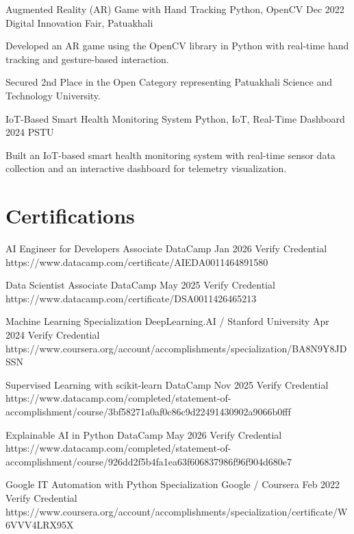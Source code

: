 \documentclass[11pt, a4paper]{article}
\begin{document}
\cvProject
    {Augmented Reality (AR) Game with Hand Tracking}
    {Python, OpenCV}
    {Dec 2022}
    {Digital Innovation Fair, Patuakhali}
    {
        \item Developed an AR game using the OpenCV library in Python with real-time hand tracking and gesture-based interaction.
        \item Secured 2nd Place in the Open Category representing Patuakhali Science and Technology University.
    }

\cvProject
    {IoT-Based Smart Health Monitoring System}
    {Python, IoT, Real-Time Dashboard}
    {2024}
    {PSTU}
    {
        \item Built an IoT-based smart health monitoring system with real-time sensor data collection and an interactive dashboard for telemetry visualization.
    }

\section{Certifications}
\cvCert
    {AI Engineer for Developers Associate}
    {DataCamp}
    {Jan 2026}
    {Verify Credential}
    {https://www.datacamp.com/certificate/AIEDA0011464891580}

\cvCert
    {Data Scientist Associate}
    {DataCamp}
    {May 2025}
    {Verify Credential}
    {https://www.datacamp.com/certificate/DSA0011426465213}

\cvCert
    {Machine Learning Specialization}
    {DeepLearning.AI / Stanford University}
    {Apr 2024}
    {Verify Credential}
    {https://www.coursera.org/account/accomplishments/specialization/BA8N9Y8JDSSN}

\cvCert
    {Supervised Learning with scikit-learn}
    {DataCamp}
    {Nov 2025}
    {Verify Credential}
    {https://www.datacamp.com/completed/statement-of-accomplishment/course/3bf58271a0af0c86c9d22491430902a9066b0fff}

\cvCert
    {Explainable AI in Python}
    {DataCamp}
    {May 2026}
    {Verify Credential}
    {https://www.datacamp.com/completed/statement-of-accomplishment/course/926dd2f5b4fa1ea63f606837986f96f904d680e7}

\cvCert
    {Google IT Automation with Python Specialization}
    {Google / Coursera}
    {Feb 2022}
    {Verify Credential}
    {https://www.coursera.org/account/accomplishments/specialization/certificate/W6VVV4LRX95X}
\end{document}
